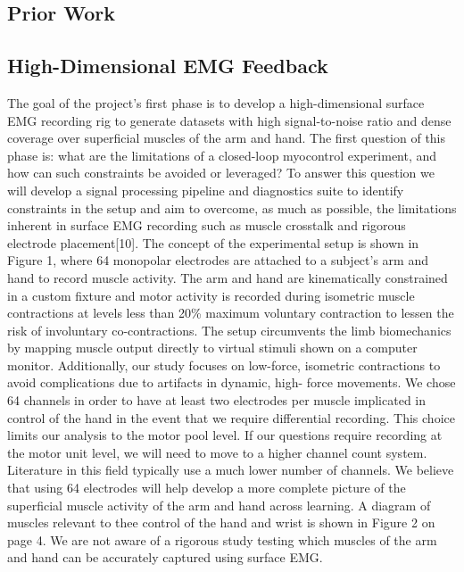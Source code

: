 {{            \subsection{Prior Work}\label{prior-work}}

            \hypertarget{high-dimensional-emg-feedback}{%
            \subsection{High-Dimensional EMG
            Feedback}\label{high-dimensional-emg-feedback}}

            The goal of the project's first phase is to develop a
            high-dimensional surface EMG recording rig to generate
            datasets with high signal-to-noise ratio and dense coverage
            over superficial muscles of the arm and hand. The first
            question of this phase is: what are the limitations of a
            closed-loop myocontrol experiment, and how can such
            constraints be avoided or leveraged? To answer this question
            we will develop a signal processing pipeline and diagnostics
            suite to identify constraints in the setup and aim to
            overcome, as much as possible, the limitations inherent in
            surface EMG recording such as muscle crosstalk and rigorous
            electrode placement{[}10{]}. The concept of the experimental
            setup is shown in Figure 1, where 64 monopolar electrodes
            are attached to a subject's arm and hand to record muscle
            activity. The arm and hand are kinematically constrained in
            a custom fixture and motor activity is recorded during
            isometric muscle contractions at levels less than 20\%
            maximum voluntary contraction to lessen the risk of
            involuntary co-contractions. The setup circumvents the limb
            biomechanics by mapping muscle output directly to virtual
            stimuli shown on a computer monitor. Additionally, our study
            focuses on low-force, isometric contractions to avoid
            complications due to artifacts in dynamic, high- force
            movements. We chose 64 channels in order to have at least
            two electrodes per muscle implicated in control of the hand
            in the event that we require differential recording. This
            choice limits our analysis to the motor pool level. If our
            questions require recording at the motor unit level, we will
            need to move to a higher channel count system. Literature in
            this field typically use a much lower number of channels. We
            believe that using 64 electrodes will help develop a more
            complete picture of the superficial muscle activity of the
            arm and hand across learning. A diagram of muscles relevant
            to thee control of the hand and wrist is shown in Figure 2
            on page 4. We are not aware of a rigorous study testing
            which muscles of the arm and hand can be accurately captured
            using surface EMG.

}
